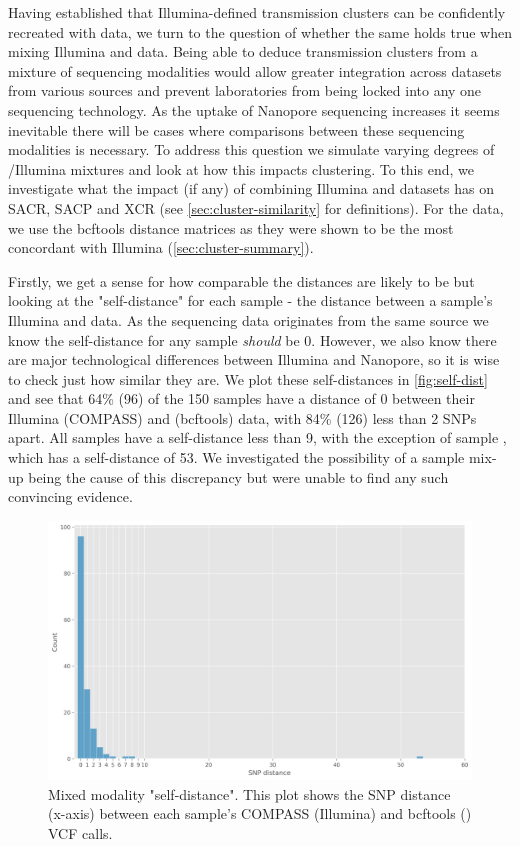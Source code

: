 Having established that Illumina-defined transmission clusters can be
confidently recreated with \ont{} data, we turn to the question of whether the same holds true when mixing Illumina and
\ont{} data. Being able to deduce transmission clusters from a mixture of sequencing
modalities would allow greater integration across datasets from various
sources and prevent laboratories from being locked into any one
sequencing technology. As the uptake of Nanopore sequencing increases it seems
inevitable there will be cases where comparisons between these
sequencing modalities is necessary. To address this question we simulate
varying degrees of \ont{}/Illumina mixtures and look at how this impacts
clustering. To this end, we investigate what the impact (if any) of combining
Illumina and \ont{} datasets has on SACR, SACP and XCR (see \autoref{sec:cluster-similarity} for definitions). For the \ont{} data, we use the bcftools distance matrices as they were shown to be the most concordant with Illumina (\autoref{sec:cluster-summary}).

Firstly, we get a sense for how comparable the distances are likely to
be but looking at the "self-distance" for each sample - the distance
between a sample's Illumina and \ont{} data. 
As the sequencing data originates from the same source we
know the self-distance for any sample \emph{should} be 0. However, we
also know there are major technological differences between Illumina and
Nanopore, so it is wise to check just how similar they are.
We plot these self-distances in \autoref{fig:self-dist} and see that 64\% (96) of the 150 samples have a distance of 0 between their Illumina (COMPASS) and \ont{} (bcftools) data, with 84\% (126) less than 2 SNPs apart. All samples have a self-distance less than 9, with the exception of sample , which has a self-distance of 53. We investigated the possibility of a sample mix-up being the cause of this discrepancy but were unable to find any such convincing evidence. 

\begin{figure}
\begin{center}
\includegraphics[width=0.90\columnwidth]{Chapter2/Figs/mixed_self_dist.png}
\caption{{Mixed modality "self-distance". This plot shows the SNP distance
(x-axis) between each sample's COMPASS (Illumina) and bcftools
(\ont{}) VCF calls.
{\label{fig:self-dist}}%
}}
\end{center}
\end{figure}

